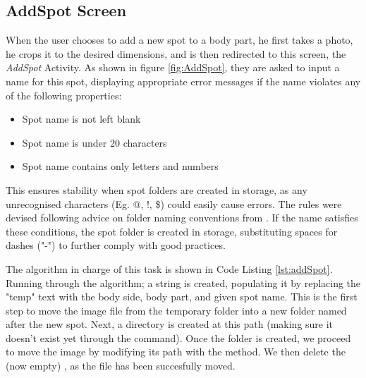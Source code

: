 \subsection{AddSpot Screen}

When the user chooses to add a new spot to a body part, he first takes a photo, he crops it to the desired dimensions, and is then redirected to this screen, the \emph{AddSpot} Activity. As shown in figure \ref{fig:AddSpot}, they are asked to input a name for this spot, displaying appropriate error messages if the name violates any of the following properties:
\begin{itemize}
    \item Spot name is not left blank
    \item Spot name is under 20 characters
    \item Spot name contains only letters and numbers
\end{itemize}
This ensures stability when spot folders are created in storage, as any unrecognised characters (Eg. @, !, \$) could easily cause errors. The rules were devised following advice on folder naming conventions from \cite{santaguida_2011}. If the name satisfies these conditions, the spot folder is created in storage, substituting spaces for dashes ("-") to further comply with good practices.

The algorithm in charge of this task is shown in Code Listing \ref{lst:addSpot}. Running through the algorithm; a  string is created, populating it by replacing the "temp" text with the body side, body part, and given spot name. This is the first step to move the image file from the temporary folder into a new folder named after the new spot. Next, a directory  is created at this path (making sure it doesn't exist yet through the  command). Once the folder is created, we proceed to move the image by modifying its path with the  method. We then delete the (now empty) , as the file has been succesfully moved.

